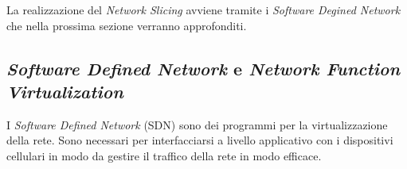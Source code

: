 La realizzazione del \textit{Network Slicing} avviene tramite i \textit{Software Degined Network} che nella prossima sezione verranno approfonditi.

\clearpage

\subsection{\textit{Software Defined Network} e  \textit{Network Function Virtualization}}
I \textit{Software Defined Network} (SDN) sono dei programmi per la virtualizzazione della rete. Sono necessari per interfacciarsi a livello applicativo con i dispositivi cellulari 
in modo da gestire il traffico della rete in modo efficace\cite{5g-sdn}.